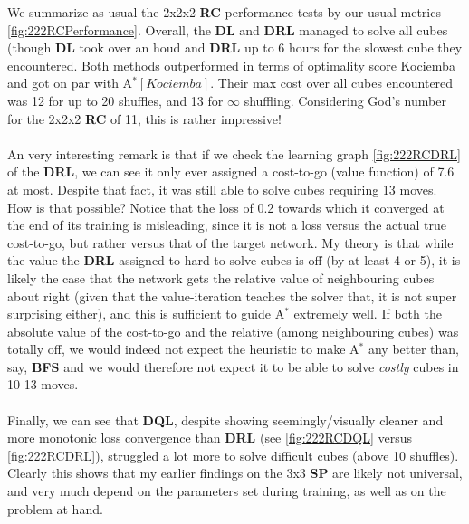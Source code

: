 
We summarize as usual the 2x2x2 \textbf{RC} performance tests by our usual metrics \ref{fig:222RCPerformance}. Overall, the \textbf{DL} and \textbf{DRL} managed to solve all cubes (though \textbf{DL} took over an houd and \textbf{DRL} up to 6 hours for the slowest cube they encountered. Both methods outperformed in terms of optimality score Kociemba and got on par with A$^{*}[Kociemba]$. Their max cost over all cubes encountered was 12 for up to 20 shuffles, and 13 for $\infty$ shuffling. Considering God's number for the 2x2x2 \textbf{RC} of 11, this is rather impressive!
\\
\\
An very interesting remark is that if we check the learning graph \ref{fig:222RCDRL} of the \textbf{DRL}, we can see it only ever assigned a cost-to-go (value function) of 7.6 at most. Despite that fact, it was still able to solve cubes requiring 13 moves. How is that possible? Notice that the loss of 0.2 towards which it converged at the end of its training is misleading, since it is not a loss versus the actual true cost-to-go, but rather versus that of the target network. My theory is that while the value the \textbf{DRL} assigned to hard-to-solve cubes is off (by at least 4 or 5), it is likely the case that the network gets the relative value of neighbouring cubes about right (given that the value-iteration teaches the solver that, it is not super surprising either), and this is sufficient to guide A$^{*}$ extremely well. If both the absolute value of the cost-to-go and the relative (among neighbouring cubes) was totally off, we would indeed not expect the heuristic to make A$^{*}$ any better than, say, \textbf{BFS} and we would therefore not expect it to be able to solve \textit{costly} cubes in 10-13 moves.
\\
\\
Finally, we can see that \textbf{DQL}, despite showing seemingly/visually cleaner and more monotonic loss convergence than \textbf{DRL} (see \ref{fig:222RCDQL} versus \ref{fig:222RCDRL}), struggled a lot more to solve difficult cubes (above 10 shuffles). Clearly this shows that my earlier findings on the 3x3 \textbf{SP} are likely not universal, and very much depend on the parameters set during training, as well as on the problem at hand.

